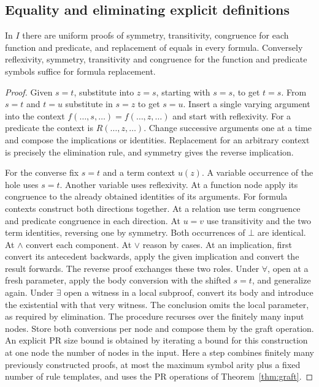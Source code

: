 \subsection{Equality and eliminating explicit definitions}

\begin{proposition}\label{prop:derived-eq}
In $I$ there are uniform proofs of symmetry, transitivity, congruence for
each function and predicate, and replacement of equals in every formula.
Conversely reflexivity, symmetry, transitivity and congruence for
the function and predicate symbols suffice for formula replacement.
\end{proposition}
\begin{proof}
Given $s=t$, substitute into $z=s$, starting with $s=s$, to get $t=s$.
From $s=t$ and $t=u$ substitute in $s=z$ to get $s=u$. Insert a single
varying argument into the context
$f(\ldots,s,\ldots)=f(\ldots,z,\ldots)$ and start with reflexivity.
For a predicate the context is $R(\ldots,z,\ldots)$. Change
successive arguments one at a time and compose the implications or
identities. Replacement for an arbitrary context is precisely the
elimination rule, and symmetry gives the reverse implication.

For the converse fix $s=t$ and a term context $u(z)$. A variable occurrence
of the hole uses $s=t$. Another variable uses reflexivity. At a function
node apply its congruence to the already obtained identities of its
arguments. For formula contexts construct both directions together.
At a relation use term congruence and predicate congruence in each
direction. At $u=v$ use transitivity and the two term identities,
reversing one by symmetry. Both occurrences of $\bot$ are identical.
At $\wedge$ convert each component. At $\vee$ reason by cases. At an
implication, first convert its antecedent backwards, apply the given
implication and convert the result forwards. The reverse proof exchanges
these two roles. Under $\forall$, open at a fresh parameter, apply the
body conversion with the shifted $s=t$, and generalize again. Under
$\exists$ open a witness in a local subproof, convert its body and
introduce the existential with that very witness. The conclusion omits
the local parameter, as required by elimination. The procedure recurses
over the finitely many input nodes. Store both conversions per node
and compose them by the graft operation. An explicit PR size bound is
obtained by iterating a bound for this construction at one node the
number of nodes in the input. Here a step combines finitely many
previously constructed proofs, at most the maximum symbol arity plus
a fixed number of rule templates, and uses the PR operations of
Theorem~\ref{thm:graft}.
\end{proof}


